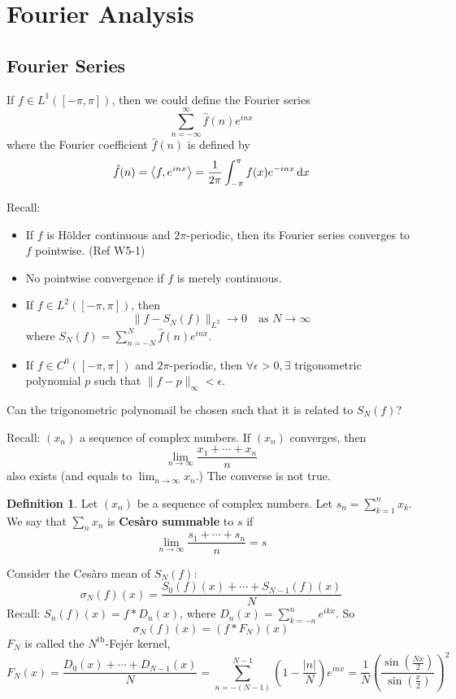 \documentclass{article}
\theoremstyle{definition}
\newtheorem{dfn}{Definition}
\begin{document}
\section{Fourier Analysis}

\subsection{Fourier Series}

If $f \in L^1([-\pi, \pi])$, then we could define the Fourier series 
\[
	\sum_{n = -\infty}^\infty \hat{f}(n) e^{inx}
\]
where the Fourier coefficient $\hat{f}(n)$ is defined by
\[
	\hat{f}(n) = \ev{f, e^{inx}} = \frac{1}{2 \pi} \int_{- \pi}^\pi f(x) e^{-inx} \dd{x}
\]

Recall:
\begin{itemize}
	\item If $f$ is H\"older continuous and $2 \pi$-periodic, then its Fourier series converges to $f$ pointwise. (Ref W5-1)

	\item No pointwise convergence if $f$ is merely continuous.

	\item If $f \in L^2([-\pi, \pi])$, then
		\[
			\|f - S_N(f)\|_{L^2} \to 0 \quad \text{as } N \to \infty
		\]
		where $S_N(f) = \sum_{n = -N}^N \hat{f}(n) e^{inx}$.

	\item If $f \in C^0([-\pi, \pi])$ and $2 \pi$-periodic, then $\forall \epsilon > 0, \exists$ trigonometric polynomial $p$ such that $\|f - p\|_{\infty} < \epsilon$.
\end{itemize}

Can the trigonometric polynomail be chosen such that it is related to $S_N(f)$?

Recall: $(x_n)$ a sequence of complex numbers.
If $(x_n)$ converges, then
\[
	\lim_{n \to \infty} \frac{x_1 + \cdots + x_n}{n}
\]
also exists (and equals to $\lim_{n \to \infty} x_n$.)
The converse is not true.

\begin{dfn}
	Let $(x_n)$ be a sequence of complex numbers.
	Let $s_n = \sum_{k = 1}^n x_k$.
	We say that $\sum_n x_n$ is \textbf{Ces\`aro summable} to $s$ if 
	\[
		\lim_{n \to \infty} \frac{s_1 + \cdots + s_n}{n} = s
	\]
\end{dfn}

Consider the Ces\`aro mean of $S_N(f)$:
\[
	\sigma_N(f)(x) = \frac{S_0(f)(x) + \cdots + S_{N - 1}(f)(x)}{N}
\]
Recall: $S_n(f)(x) = f * D_n(x)$, where $D_n(x) = \sum_{k = -n}^n e^{ikx}$.
So 
\[
	\sigma_N(f)(x) = (f * F_N)(x)
\]
$F_N$ is called the $N^{\text{th}}$-Fej\'er kernel, 
\[
	F_N(x) = \frac{D_0(x) + \cdots + D_{N - 1}(x)}{N} = \sum_{n = -(N - 1)}^{N - 1} \left( 1 - \frac{|n|}{N} \right) e^{inx} = \frac{1}{N} \left( \frac{\sin \left( \frac{Nx}{2} \right)}{\sin \left( \frac{x}{2} \right)} \right)^2
\]
\end{document}
